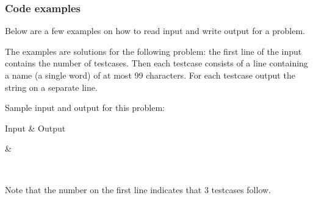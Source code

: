 \documentclass[a4paper,10pt,english,openany]{sphinxmanual}
\begin{document}
\subsubsection{Code examples}
\label{\detokenize{team:code-examples}}\label{\detokenize{team:codeexamples}}
\sphinxAtStartPar
Below are a few examples on how to read input and write output for a
problem.

\sphinxAtStartPar
The examples are solutions for the following problem: the first line
of the input contains the number of testcases. Then each testcase
consists of a line containing a name (a single word) of at most 99
characters. For each testcase output the string 
on a separate line.

\sphinxAtStartPar
Sample input and output for this problem:


\begin{savenotes}\sphinxattablestart
\sphinxthistablewithglobalstyle
\centering
\begin{tabular}[t]{*{2}{}}
\sphinxtoprule
\sphinxstyletheadfamily 
\sphinxAtStartPar
Input
&\sphinxstyletheadfamily 
\sphinxAtStartPar
Output
\\
\sphinxmidrule
\sphinxtableatstartofbodyhook
\begin{DUlineblock}{0em}
\item[] 
\item[] 
\item[] 
\item[] 
\end{DUlineblock}
&
\begin{DUlineblock}{0em}
\item[] 
\item[] 
\item[] 
\end{DUlineblock}
\\
\sphinxbottomrule
\end{tabular}
\sphinxtableafterendhook\par
\sphinxattableend\end{savenotes}

\sphinxAtStartPar
Note that the number  on the first line indicates that 3 testcases
follow.
\end{document}
